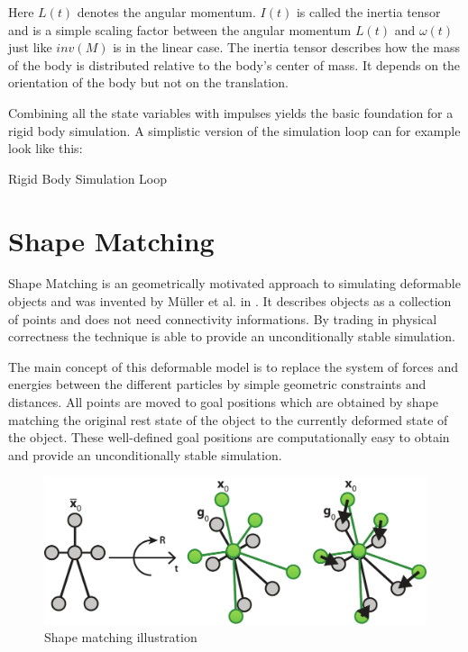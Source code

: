Here $L(t)$ denotes the angular momentum. $I(t)$ is called the inertia tensor and is a simple scaling factor between the angular momentum $L(t)$ and $\omega(t)$ just like $inv(M)$ is in the linear case. The inertia tensor describes how the mass of the body is distributed relative to the body's center of mass. It depends on the orientation of the body but not on the translation.

Combining all the state variables with impulses yields the basic foundation for a rigid body simulation. A simplistic version of the simulation loop can for example look like this:

\begin{algorithm}[htb]
\caption{Rigid Body Simulation Loop}
\begin{algorithmic}[1]
\ENDFOR
{}
	\ENDFOR
\ENDFOR
{}
\ENDFOR
{}
\ENDFOR
\end{algorithmic}
\end{algorithm}

\section{Shape Matching}
\label{sec:shape_matching}

Shape Matching is an geometrically motivated approach to simulating deformable objects and was invented by M{\"u}ller et al. in \cite{Muller:2005fi}. It describes objects as a collection of points and does not need connectivity informations. By trading in physical correctness the technique is able to provide an unconditionally stable simulation. 

The main concept of this deformable model is to replace the system of forces and energies between the different particles by simple geometric constraints and distances. All points are moved to goal positions which are obtained by shape matching the original rest state of the object to the currently deformed state of the object. These well-defined goal positions are computationally easy to obtain and provide an unconditionally stable simulation.

\begin{figure}[h]
\centering
\includegraphics[width=.96\textwidth]{images/shape_matching.pdf}
\caption{Shape matching illustration}
\label{img:shape_matching}
\end{figure}

